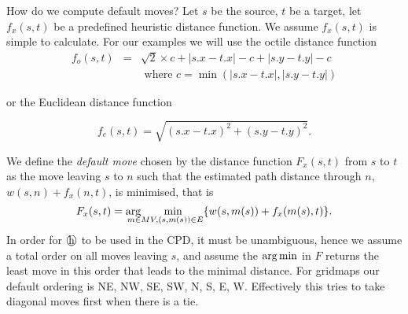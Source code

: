 \ignore
{
How do we compute default moves?
Let $s$ be the source, $t$ be a target,
let $f_x(s,t)$ be a predefined heuristic distance function.
We assume $f_x(s,t)$ is simple to calculate.
%
For our examples we will use the octile distance function
$$
\begin{array}{rcl}
f_o(s,t) & = & \sqrt{2} \times c + |s.x - t.x| - c + |s.y - t.y| - c \\
&& \mbox{~where~} c = \min (|s.x - t.x|, |s.y - t.y|)
\end{array}
$$

\noindent
or the Euclidean distance function

$$
f_e(s,t)  =  \sqrt{(s.x - t.x)^2 + (s.y - t.y)^2}.
$$

%
We define the \emph{default move} chosen by the distance function
$F_x(s,t)$ from $s$ to $t$ as the move leaving $s$ to $n$ such that
the estimated path distance through $n$, 
$w(s,n) + f_x(n,t)$, is minimised, that is 
$$
F_x(s,t) = \argmin_{\hspace{-5mm}m \in MV, (s,m(s)) \in E} \{ w(s,m(s)) + f_x(m(s),t)\}. %
$$
In order for $\heur$ to be used in the CPD, it
must be unambiguous, hence we assume a total
order on all moves leaving $s$,
and assume the $\argmin$ in $F$ returns the least
move in this order that leads to the minimal distance.
For gridmaps our default ordering is
NE, NW, SE,  SW, N, S, E, W.
Effectively this tries to take diagonal moves first when there is a tie.
}



